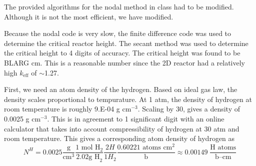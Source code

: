 \documentclass[12pt]{article}
\newcommand{\keff}{\ensuremath{k_{\mathrm{eff}}}}
\newenvironment{solnum}[2][Solution]{\begin{trivlist}
\item[\hskip \labelsep {\bfseries #1}\hskip \labelsep {\bfseries #2:}]\hspace{0.3in}\newline\newline}{\end{trivlist}}
\begin{document}
\begin{solnum}{1-2}

The provided algorithms for the nodal method in class had to be modified. Although it
is not the most efficient, we have modified.

\begin{solnum}{1-3}

Because the nodal code is very slow, the finite difference code was used to determine
the critical reactor height. The secant method was used to determine the critical
height to 4 digits of accuracy.  The critical height was found to be BLARG cm. This
is a reasonable number since the 2D reactor had a relatively high $\keff$ of
$\sim$1.27.
\end{solnum}

\clearpage

\begin{solnum}{2}

First, we need an atom density of the hydrogen.  Based on ideal gas law, the density
scales proportional to tempurature.  At 1 atm, the density of hydrogen at room
temperature is roughly 9.E-04 g cm$^{-3}$.  Scaling by 30, gives a density of 0.0025
g cm$^{-3}$.  This is in agreement to 1 significant digit with an online calculator that takes into account
compressibility of hydrogen at 30 atm and room temperature.  This gives a
corresponding atom density of hydrogen as
\begin{equation}
    N^{H} = 0.0025 \frac{\text{g}}{\text{cm}^3}\frac{1\text{ mol H}_2}{2.02\text {g
    H}_2}\frac{2 H}{1 H_2}\frac{0.60221\text{ atoms cm}^2}{\text{b}} \approx
    0.00149\;\frac{\text{H atoms}}{\text{b--cm}}
\end{equation}


\end{solnum}
\end{solnum}
\end{document}
